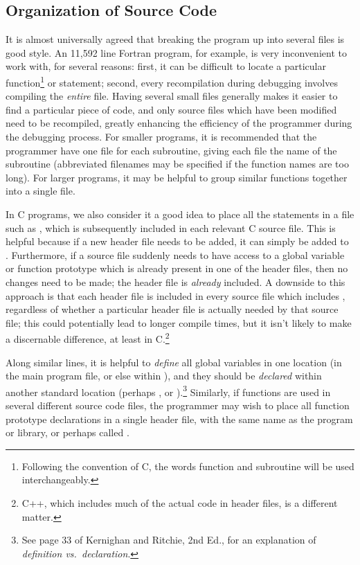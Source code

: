 \subsection{Organization of Source Code} \label{sourcecode}
It is almost universally agreed that breaking the program up into
several files is good style.  An 11,592 line Fortran program, for
example, is very inconvenient to work with, for several reasons:
first, it can be difficult to locate a particular
function\footnote{Following the convention of C, the words function
and subroutine will be used interchangeably.}  or statement; second,
every recompilation during debugging involves compiling the {\em
entire} file.  Having several small files generally makes it easier to
find a particular piece of code, and only source files which have been
modified need to be recompiled, greatly enhancing the efficiency of
the programmer during the debugging process.  For smaller programs, it
is recommended that the programmer have one file for each subroutine,
giving each file the name of the subroutine (abbreviated filenames may
be specified if the function names are too long).  For larger
programs, it may be helpful to group similar functions together into a
single file.

In C programs, we also consider it a good idea to place all the
 statements in a file such as ,
which is subsequently included in each relevant C source file.  This
is helpful because if a new header file needs to be added, it can
simply be added to .  Furthermore, if a source file
suddenly needs to have access to a global variable or function
prototype which is already present in one of the header files, then no
changes need to be made; the header file is {\em already} included.  A
downside to this approach is that each header file is included in
every source file which includes , regardless of
whether a particular header file is actually needed by that source
file; this could potentially lead to longer compile times, but it
isn't likely to make a discernable difference, at least in
C.\footnote{C++, which includes much of the actual code in header
files, is a different matter.}

Along similar lines, it is helpful to {\em define} all global
variables in one location (in the main program file, or else within
), and they should be {\em declared} within another
standard location (perhaps , or
).\footnote{See page 33 of Kernighan and Ritchie, 2nd
Ed., for an explanation of {\em definition vs.~declaration}.}
Similarly, if functions are used in several different source code
files, the programmer may wish to place all function prototype
declarations in a single header file, with the same name as the
program or library, or perhaps called .

